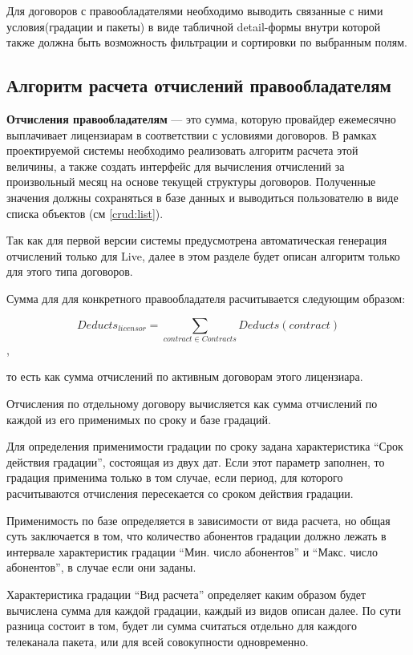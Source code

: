 Для договоров с правообладателями необходимо выводить связанные с ними условия(градации и пакеты)
в виде табличной detail-формы внутри которой также должна быть возможность фильтрации и сортировки по выбранным полям.

\subsection{Алгоритм расчета отчислений правообладателям}
\label{live:deducts}
\textbf{Отчисления правообладателям} --- это сумма, которую провайдер ежемесячно выплачивает лицензиарам
в соответствии с условиями договоров. В рамках проектируемой системы необходимо реализовать алгоритм расчета
этой величины, а также создать интерфейс для вычисления отчислений за произвольный месяц на основе текущей 
структуры договоров. Полученные значения должны сохраняться в базе данных и выводиться пользователю 
в виде списка объектов (см \ref{crud:list}).

Так как для первой версии системы предусмотрена автоматическая генерация отчислений 
только для Live, далее в этом разделе будет описан алгоритм только для этого типа договоров.

Сумма для для конкретного правообладателя расчитывается следующим образом:

$$Deducts_{licensor} = \sum_{contract \in Contracts} Deducts(contract)$$,

то есть как сумма отчислений по активным договорам этого лицензиара. 

Отчисления по отдельному договору вычисляется как сумма отчислений по каждой из его применимых по сроку и базе градаций.

Для определения применимости градации по сроку задана характеристика ``Срок действия градации'', состоящая из двух дат.
Если этот параметр заполнен, то градация применима только в том случае, если период, 
для которого расчитываются отчисления пересекается со сроком действия градации. 

Применимость по базе определяется в зависимости от вида расчета, но общая суть заключается в том, 
что количество абонентов градации должно лежать в интервале характеристик градации ``Мин. число абонентов'' и
``Макс. число абонентов'', в случае если они заданы.  

Характеристика градации ``Вид расчета'' определяет каким образом будет вычислена сумма для каждой градации,
каждый из видов описан далее. По сути разница состоит в том, будет ли сумма считаться отдельно
для каждого телеканала пакета, или для всей совокупности одновременно.

